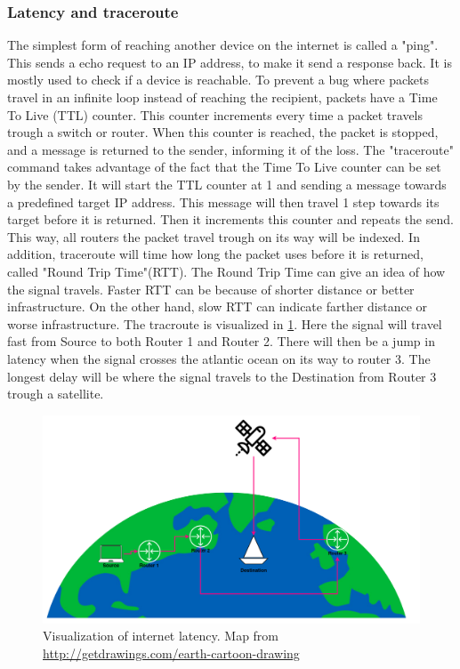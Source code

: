\subsubsection{Latency and traceroute} \label{sec:latency_method}
The simplest form of reaching another device on the internet is called a "ping". This sends a echo request to an IP address, to make it send a response back. It is mostly used to check if a device is reachable. To prevent a bug where packets travel in an infinite loop instead of reaching the recipient, packets have a Time To Live (TTL) counter. This counter increments every time a packet travels trough a switch or router. When this counter is reached, the packet is stopped, and a message is returned to the sender, informing it of the loss.
The "traceroute" command takes advantage of the fact that the Time To Live counter can be set by the sender. It will start the TTL counter at 1 and sending a message towards a predefined target IP address. This message will then travel 1 step towards its target before it is returned. Then it increments this counter and repeats the send. This way, all routers the packet travel trough on its way will be indexed. In addition, traceroute will time how long the packet uses before it is returned, called "Round Trip Time"(RTT).
The Round Trip Time can give an idea of how the signal travels. Faster RTT can be because of shorter distance or better infrastructure. On the other hand, slow RTT can indicate farther distance or worse infrastructure.
The tracroute is visualized in \cref{fig:latency}. Here the signal will travel fast from Source to both Router 1 and Router 2. There will then be a jump in latency when the signal crosses the atlantic ocean on its way to router 3. The longest delay will be where the signal travels to the Destination from Router 3 trough a satellite.

\begin{figure} [H]
    \centering
    \includegraphics[scale=0.3]{Figurer/latency.png}
    \caption{Visualization of internet latency. Map from \href{http://getdrawings.com/earth-cartoon-drawing}{http://getdrawings.com/earth-cartoon-drawing}}
    \label{fig:latency}
\end{figure}

